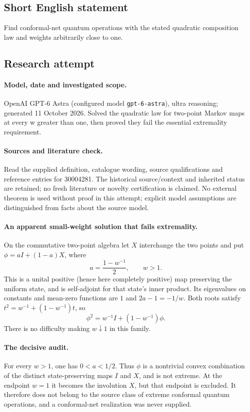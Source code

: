 \documentclass[11pt]{article}
\begin{document}
\subsection{Short English statement}
Find conformal-net quantum operations with the stated quadratic composition law and weights arbitrarily close to one.
\subsection{Research attempt}
\paragraph{Model, date and investigated scope.}
OpenAI GPT-6 Astra (configured model \texttt{gpt-6-astra}), ultra reasoning; generated 11 October 2026. Solved the quadratic law for two-point Markov maps at every w greater than one, then proved they fail the essential extremality requirement.

\paragraph{Sources and literature check.}
Read the supplied definition, catalogue wording, source qualifications and reference entries for 30004281. The historical source/context and inherited status are retained; no fresh literature or novelty certification is claimed. No external theorem is used without proof in this attempt; explicit model assumptions are distinguished from facts about the source model.

\paragraph{An apparent small-weight solution that fails extremality.} On the commutative two-point algebra let \(X\) interchange the two points and put \(\phi=aI+(1-a)X\), where
\[
 a=\frac{1-w^{-1}}2,\qquad w>1.
\]
This is a unital positive (hence here completely positive) map preserving the uniform state, and is self-adjoint for that state's inner product. Its eigenvalues on constants and mean-zero functions are \(1\) and \(2a-1=-1/w\). Both roots satisfy \(t^2=w^{-1}+(1-w^{-1})t\), so
\[
 \phi^2=w^{-1}I+(1-w^{-1})\phi.
\]
There is no difficulty making \(w\downarrow1\) in this family.
\paragraph{The decisive audit.} For every \(w>1\), one has \(0<a<1/2\). Thus \(\phi\) is a nontrivial convex combination of the distinct state-preserving maps \(I\) and \(X\), and is not extreme. At the endpoint \(w=1\) it becomes the involution \(X\), but that endpoint is excluded. It therefore does not belong to the source class of extreme conformal quantum operations, and a conformal-net realization was never supplied.
\end{document}
